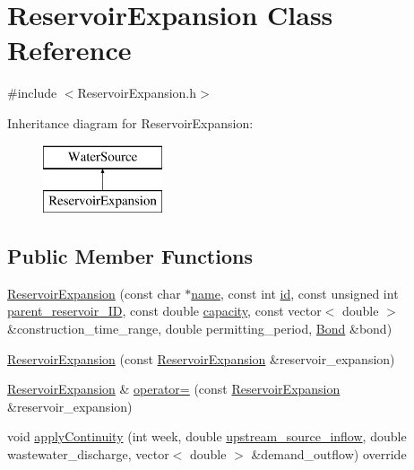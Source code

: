 \hypertarget{classReservoirExpansion}{}\section{Reservoir\+Expansion Class Reference}
\label{classReservoirExpansion}


{\ttfamily \#include $<$Reservoir\+Expansion.\+h$>$}

Inheritance diagram for Reservoir\+Expansion\+:\begin{figure}[H]
\begin{center}
\leavevmode
\includegraphics[height=2.000000cm]{classReservoirExpansion}
\end{center}
\end{figure}
\subsection*{Public Member Functions}
\begin{DoxyCompactItemize}
\item 
\mbox{\hyperlink{classReservoirExpansion_aa742cae4276e97847681dac4f828b5ae}{Reservoir\+Expansion}} (const char $\ast$\mbox{\hyperlink{classWaterSource_a846ea74c5b453d014f594d41fee8c765}{name}}, const int \mbox{\hyperlink{classWaterSource_a6eafe5dfefd317877d1244e8a7c6e742}{id}}, const unsigned int \mbox{\hyperlink{classReservoirExpansion_a56527196174404cfed20b863df2ab0ba}{parent\+\_\+reservoir\+\_\+\+ID}}, const double \mbox{\hyperlink{classWaterSource_a2ec257b415b248214a8bce7fc5267723}{capacity}}, const vector$<$ double $>$ \&construction\+\_\+time\+\_\+range, double permitting\+\_\+period, \mbox{\hyperlink{classBond}{Bond}} \&bond)
\item 
\mbox{\hyperlink{classReservoirExpansion_abc10a6725f7fb85b7478fb6b0b79bd1e}{Reservoir\+Expansion}} (const \mbox{\hyperlink{classReservoirExpansion}{Reservoir\+Expansion}} \&reservoir\+\_\+expansion)
\item 
\mbox{\hyperlink{classReservoirExpansion}{Reservoir\+Expansion}} \& \mbox{\hyperlink{classReservoirExpansion_af197058813986b16c34ae206c04e14bf}{operator=}} (const \mbox{\hyperlink{classReservoirExpansion}{Reservoir\+Expansion}} \&reservoir\+\_\+expansion)
\item 
void \mbox{\hyperlink{classReservoirExpansion_a18614050354dced5cc2747eeda0c2397}{apply\+Continuity}} (int week, double \mbox{\hyperlink{classWaterSource_a7a69b2e9b6030f1035e6cf44d2918ee5}{upstream\+\_\+source\+\_\+inflow}}, double wastewater\+\_\+discharge, vector$<$ double $>$ \&demand\+\_\+outflow) override
\end{DoxyCompactItemize}
